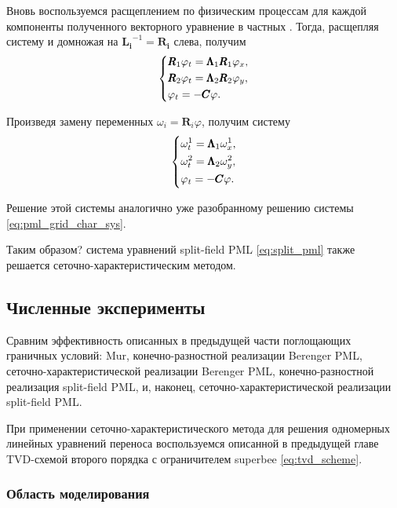 Вновь воспользуемся расщеплением по физическим процессам для каждой компоненты полученного векторного уравнение в частных \cite{rashep_marchuk}. Тогда, расщепляя систему и домножая на $\pmb{L_i}^{-1}=\pmb{R_i}$ слева, получим
\begin{equation*}
    \begin{dcases}
        \pmb{R}_1\varphi_t = \pmb{\Lambda}_1\pmb{R}_1 \varphi_x , \\
        \pmb{R}_2\varphi_t = \pmb{\Lambda}_2\pmb{R}_2 \varphi_y , \\
        \varphi_t = - \pmb{C} \varphi  .
    \end{dcases}
\end{equation*}

\noindent Произведя замену переменных $\omega_i = \pmb{R}_i \varphi$, получим систему
\begin{equation*}
    \begin{dcases}
        \omega_t^1 = \pmb{\Lambda}_1\omega_x^1 , \\
        \omega_t^2 = \pmb{\Lambda}_2\omega_y^2 , \\
        \varphi_t = - \pmb{C} \varphi  .
    \end{dcases}
\end{equation*}

\noindent Решение этой системы аналогично уже разобранному решению системы \eqref{eq:pml_grid_char_sys}. 

Таким образом? система уравнений split-field PML \eqref{eq:split_pml} также решается сеточно-харак\-теристическим методом.

\subsection{Численные эксперименты}

Сравним эффективность описанных в предыдущей части поглощающих граничных условий: Mur, конечно-разностной реализации Berenger PML, сеточно-характе\-рис\-тической реализации Berenger PML, конечно-разностной реализация split-field PML, и, наконец, сеточно-характеристической реализации split-field PML.

При применении сеточно-характеристического метода для решения одномерных линейных уравнений переноса воспользуемся описанной в предыдущей главе TVD-схемой второго порядка с ограничителем superbee \eqref{eq:tvd_scheme}.

\subsubsection{Область моделирования}

